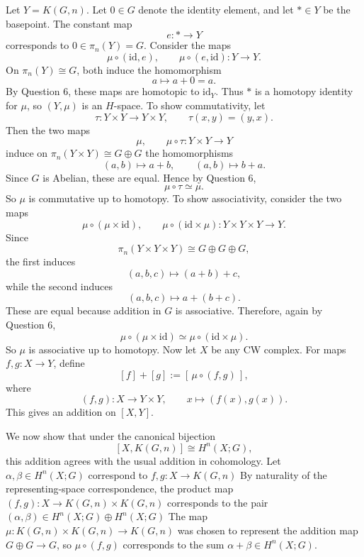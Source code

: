 \documentclass[12pt]{article}
\begin{document}
\begin{solution} Let \(Y=K(G,n)\). Let \(0\in G\) denote the identity element, and let \(*\in Y\) be the basepoint. The constant map
\[
e:* \to Y
\]
corresponds to \(0\in \pi_n(Y)=G\). Consider the maps
\[
\mu\circ(\mathrm{id},e),\qquad \mu\circ(e,\mathrm{id}):Y\to Y.
\]
On \(\pi_n(Y)\cong G\), both induce the homomorphism
\[
a\longmapsto a+0=a.
\]
By Question 6, these maps are homotopic to \(\mathrm{id}_Y\). Thus \(*\) is a homotopy identity for \(\mu\), so \((Y,\mu)\) is an \(H\)-space. To show commutativity, let
\[
\tau:Y\times Y\to Y\times Y,\qquad \tau(x,y)=(y,x).
\]
Then the two maps
\[
\mu,\qquad \mu\circ\tau : Y\times Y\to Y
\]
induce on \(\pi_n(Y\times Y)\cong G\oplus G\) the homomorphisms
\[
(a,b)\mapsto a+b,\qquad (a,b)\mapsto b+a.
\]
Since \(G\) is Abelian, these are equal. Hence by Question 6,
\[
\mu\circ\tau \simeq \mu.
\]
So \(\mu\) is commutative up to homotopy. To show associativity, consider the two maps
\[
\mu\circ(\mu\times \mathrm{id}),\qquad \mu\circ(\mathrm{id}\times \mu):
Y\times Y\times Y\to Y.
\]
Since
\[
\pi_n(Y\times Y\times Y)\cong G\oplus G\oplus G,
\]
the first induces
\[
(a,b,c)\longmapsto (a+b)+c,
\]
while the second induces
\[
(a,b,c)\longmapsto a+(b+c).
\]
These are equal because addition in \(G\) is associative. Therefore, again by Question 6,
\[
\mu\circ(\mu\times \mathrm{id}) \simeq \mu\circ(\mathrm{id}\times \mu).
\]
So \(\mu\) is associative up to homotopy. Now let \(X\) be any CW complex. For maps \(f,g:X\to Y\), define
\[
[f]+[g]:=[\,\mu\circ (f,g)\,],
\]
where
\[
(f,g):X\to Y\times Y,\qquad x\mapsto (f(x),g(x)).
\]
This gives an addition on \([X,Y]\).

We now show that under the canonical bijection
\[
[X,K(G,n)]\cong H^n(X;G),
\]
this addition agrees with the usual addition in cohomology. Let $\alpha,\beta\in H^n(X;G)$ correspond to $f,g:X\to K(G,n)$
By naturality of the representing-space correspondence, the product map $(f,g):X\to K(G,n)\times K(G,n)$
corresponds to the pair $(\alpha,\beta)\in H^n(X;G)\oplus H^n(X;G)$
The map $\mu:K(G,n)\times K(G,n)\to K(G,n)$
was chosen to represent the addition map $G\oplus G\to G$, so $\mu\circ(f,g)$ corresponds to the sum $\alpha+\beta\in H^n(X;G)$.
\end{solution}
\end{document}
